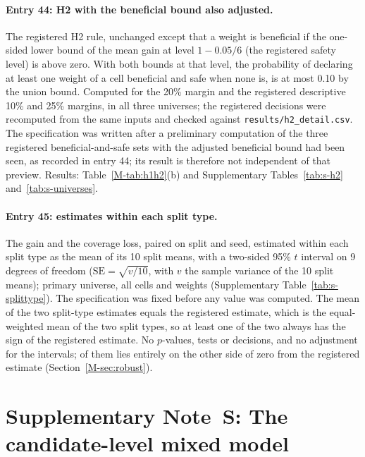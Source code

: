 \documentclass[11pt,a4paper]{article}
\newcounter{snote}
\renewcommand{\thesnote}{S\arabic{snote}}
\newcommand{\snote}[2]{\refstepcounter{snote}\label{#1}\section*{Supplementary Note~\thesnote: #2}}
\begin{document}
\paragraph{Entry 44: H2 with the beneficial bound also adjusted.} The registered H2 rule, unchanged except that a weight is
beneficial if the one-sided lower bound of the mean gain at level $1-0.05/6$ (the registered safety level) is above zero. With
both bounds at that level, the probability of declaring at least one weight of a cell beneficial and safe when none is, is at most
0.10 by the union bound. Computed for the 20\% margin and the registered descriptive 10\% and 25\% margins, in all three universes;
the registered decisions were recomputed from the same inputs and checked against \texttt{results/h2\_detail.csv}. The
specification was written after a preliminary computation of the three registered beneficial-and-safe sets with the adjusted
beneficial bound had been seen, as recorded in entry 44; its result is therefore not independent of that preview. Results:
Table~\ref{M-tab:h1h2}(b) and Supplementary Tables~\ref{tab:s-h2} and~\ref{tab:s-universes}.

\paragraph{Entry 45: estimates within each split type.} The gain and the coverage loss, paired on split and seed, estimated
within each split type as the mean of its 10 split means, with a two-sided 95\% $t$ interval on 9 degrees of freedom
($\mathrm{SE}=\sqrt{v/10}$, with $v$ the sample variance of the 10 split means); primary universe, all cells and weights
(Supplementary Table~\ref{tab:s-splittype}). The specification was fixed before any value was computed. The mean of the two
split-type estimates equals the registered estimate, which is the equal-weighted mean of the two split types, so at least one of
the two always has the sign of the registered estimate. No $p$-values, tests or decisions, and no adjustment for the
 intervals;  of them lies entirely on the other side of
zero from the registered estimate (Section~\ref{M-sec:robust}).

\snote{note:glmm}{The candidate-level mixed model}
\end{document}
